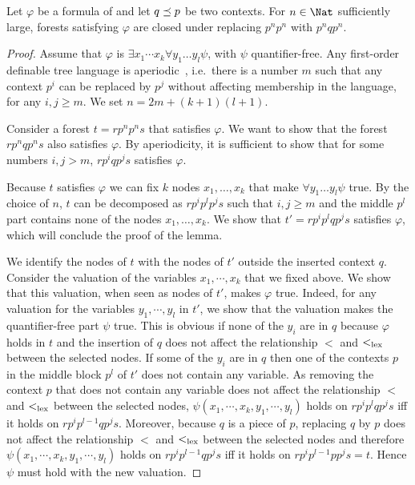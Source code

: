 \documentclass{LMCS}
\begin{document}
\begin{lem}\label{lemma:correctness}
  Let $\varphi$ be a formula of \Stwol and let $q \preceq p$ be two
contexts. For $n \in \Nat$ sufficiently large, forests  satisfying $\varphi$ are closed under replacing
$p^n p^n$ with $p^nqp^n$.
\end{lem}
\begin{proof}
  Assume that $\varphi$ is $\exists x_1 \cdots x_k \forall y_1 \ldots
  y_l \psi$, with $\psi$ quantifier-free.  Any first-order definable
  tree language is aperiodic~\cite{schutzenberger}, i.e.~there is a number $m$ such that any
  context $p^i$ can be replaced by $p^j$ without affecting membership
  in the language, for any $i,j\geq m$. We set $n=2m+(k+1)(l+1)$.

 Consider a forest $t=rp^np^ns$ that satisfies $\varphi$. We want to show that
 the forest $rp^nqp^ns$ also satisfies $\varphi$. By aperiodicity, it
 is sufficient to show that 
 for some numbers $i,j>m$, $rp^iqp^js$ satisfies $\varphi$.

 Because $t$ satisfies $\varphi$ we can fix $k$ nodes $x_1,\ldots, x_k$
 that make $\forall y_1 \ldots y_l \psi$ true. By the choice of $n$,
 $t$ can be decomposed as $rp^ip^lp^js$ such that $i,j\geq m$ and the
 middle $p^l$ part contains none of the nodes $x_1,\ldots,x_k$. We show that
 $t'=rp^ip^lqp^js$ satisfies $\varphi$, which will conclude the proof
 of the lemma.

 We identify the nodes of $t$ with the nodes of $t'$ outside the inserted
 context $q$.  Consider the valuation of the variables $x_1,\cdots, x_k$ that
 we fixed above. We show that this valuation, when seen as nodes of $t'$, makes
 $\varphi$ true. Indeed, for any valuation for the variables $y_1,\cdots,y_l$
 in $t'$, we show that the valuation makes the quantifier-free part $\psi$
 true. This is obvious if none of the $y_i$ are in $q$ because $\varphi$ holds
 in $t$ and the insertion of $q$ does not affect the relationship $<$ and
 $<_\mathrm{lex}$ between the selected nodes.  If some of the $y_i$ are in $q$ then one
 of the contexts $p$ in the middle block $p^l$ of $t'$ does not contain any
 variable. As removing the context $p$ that does not contain any variable does
 not affect the relationship $<$ and $<_\mathrm{lex}$ between the selected nodes, $\psi(x_1,\cdots,x_k,y_1,\cdots,y_l)$
 holds on $rp^ip^lqp^js$ iff it holds on $rp^ip^{l-1}qp^js$.
 Moreover, because $q$ is a piece of $p$, replacing $q$ by $p$  does
 not affect the relationship $<$ and $<_\mathrm{lex}$ between the selected nodes and therefore
$\psi(x_1,\cdots,x_k,y_1,\cdots,y_l)$ holds on $rp^ip^{l-1}qp^js$ iff it holds on $rp^ip^{l-1}pp^js=t$.
 Hence $\psi$ must hold with the new valuation.
\end{proof}
\end{document}
